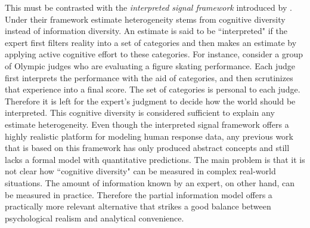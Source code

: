 \documentclass[11pt,twoside]{article}
\begin{document}
This must be contrasted with the \textit{interpreted signal framework} introduced by  \cite{hong2009interpreted}. Under their framework estimate heterogeneity stems from cognitive diversity instead of information diversity. An estimate is said to be ``interpreted" if the expert
first filters reality into a set of categories and then makes an
estimate by applying active cognitive effort to these categories. For
instance, consider a group of Olympic judges who are evaluating a figure skating
performance. Each judge first interprets the performance with the aid
of categories, and then scrutinizes that experience into a final
score. The set of categories is personal to each judge. Therefore it is left for the expert's judgment to decide how the world should be interpreted. This cognitive diversity is considered sufficient to explain any estimate heterogeneity. Even though the interpreted signal framework offers a highly realistic platform for modeling human response data, any previous work that is based on this framework has only produced abstract concepts and still lacks a formal model with quantitative predictions. The main problem is that it is not clear how ``cognitive diversity" can be measured in complex real-world situations. The amount of information known by an expert, on other hand, can be measured in practice. Therefore the partial information model offers a practically more relevant alternative that strikes a good balance between psychological realism and analytical convenience. 



\end{document}
